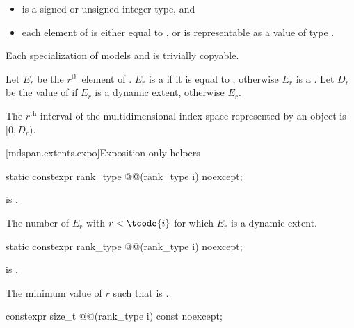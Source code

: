\pnum
\mandates
\begin{itemize}
\item
{} is a signed or unsigned integer type, and
\item
each element of  is either equal to , or
is representable as a value of type .
\end{itemize}

\pnum
Each specialization of  models  and
is trivially copyable.

\pnum
Let $E_r$ be the $r^\text{th}$ element of .
$E_r$ is a  if it is equal to ,
otherwise $E_r$ is a .
Let $D_r$ be the value of 
if $E_r$ is a dynamic extent,
otherwise $E_r$.

\pnum
The $r^\text{th}$ interval of the multidimensional index space
represented by an  object is $[0, D_r)$.

[mdspan.extents.expo]{Exposition-only helpers}

\begin{itemdecl}
static constexpr rank_type @@(rank_type i) noexcept;
\end{itemdecl}

\begin{itemdescr}
\pnum
\expects
{} is .

\pnum
\returns
The number of $E_r$ with $r < \tcode{i}$ for which $E_r$ is a dynamic extent.
\end{itemdescr}

\begin{itemdecl}
static constexpr rank_type @@(rank_type i) noexcept;
\end{itemdecl}

\begin{itemdescr}
\pnum
\expects
{} is .

\pnum
\returns
The minimum value of $r$
such that  is .
\end{itemdescr}

\begin{itemdecl}
constexpr size_t @@(rank_type i) const noexcept;
\end{itemdecl}

